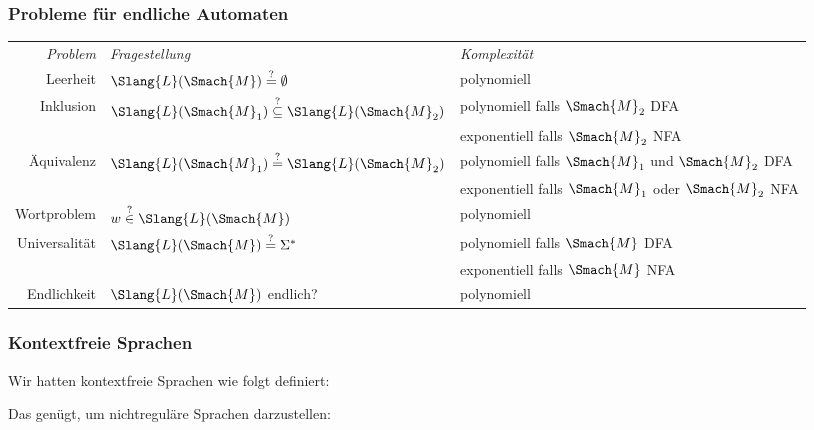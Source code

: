 \documentclass[aspectratio=1610,onlymath]{beamer}
\begin{document}
\begin{frame}\frametitle{Probleme für endliche Automaten}

\begin{tabular}{@{}rll@{}}
\emph{Problem} & \emph{Fragestellung} & \emph{Komplexität} \\[1ex]
Leerheit & $\Slang{L}(\Smach{M})\stackrel{?}{=}\emptyset$  & polynomiell\\[1ex]
Inklusion & $\Slang{L}(\Smach{M}_1)\stackrel{?}{\subseteq}\Slang{L}(\Smach{M}_2)$  & polynomiell falls $\Smach{M}_2$ DFA\\[-0.5ex]
	& & exponentiell falls $\Smach{M}_2$ NFA\\[1ex]
Äquivalenz & $\Slang{L}(\Smach{M}_1)\stackrel{?}{=}\Slang{L}(\Smach{M}_2)$  & polynomiell falls $\Smach{M}_1$ und $\Smach{M}_2$ DFA\\[-0.5ex]
	& & exponentiell falls $\Smach{M}_1$ oder $\Smach{M}_2$ NFA\\[1ex]
Wortproblem & $w\stackrel{?}{\in}\Slang{L}(\Smach{M})$  & polynomiell\\[1ex]
Universalität & $\Slang{L}(\Smach{M})\stackrel{?}{=}\Sigma^*$  & polynomiell falls $\Smach{M}$ DFA\\[-0.5ex]
	& & exponentiell falls $\Smach{M}$ NFA\\[1ex]
Endlichkeit & $\Slang{L}(\Smach{M})$ endlich? & polynomiell 
\end{tabular}

\end{frame}


\begin{frame}\frametitle{Kontextfreie Sprachen}

Wir hatten kontextfreie Sprachen wie folgt definiert:

\medskip
{}\medskip\pause

Das genügt, um nichtreguläre Sprachen darzustellen:


\end{frame}
\end{document}
